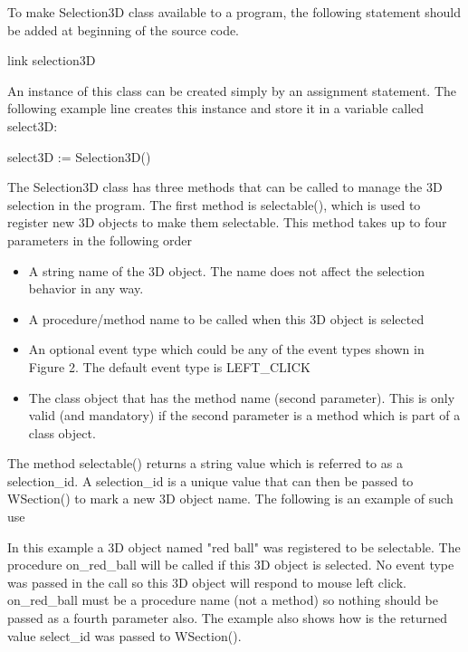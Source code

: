 \documentclass[letterpaper]{article}
\newcommand\liststyleLix{%
\renewcommand\theenumi{\arabic{enumi}}
\renewcommand\theenumii{\arabic{enumii}}
\renewcommand\theenumiii{\arabic{enumiii}}
\renewcommand\theenumiv{\arabic{enumiv}}
\renewcommand\labelenumi{\theenumi.}
\renewcommand\labelenumii{\theenumii.}
\renewcommand\labelenumiii{\theenumiii.}
\renewcommand\labelenumiv{\theenumiv.}
}
\begin{document}
{\bigskip

To make Selection3D class available to a program, the following
statement should be added at beginning of the source code.


\bigskip

{\sffamily
link selection3D}


\bigskip

An instance of this class can be created simply by an assignment
statement. The following example line creates this instance and store
it in a variable called \textsf{select3D:}

\bigskip

{\sffamily
select3D := Selection3D()}


\bigskip

The \textsf{Selection3D} class has three methods that can be called
to manage the 3D selection in the program. The first method is
\textsf{selectable()}, which is used to register new 3D objects to
make them selectable. This method takes up to four parameters in the
following order

\bigskip

\liststyleLix
\begin{itemize}
\item A string name of the 3D object. The name does not affect the selection behavior in any way.
\item A procedure/method name to be called when this 3D object is selected
\item An optional event type which could be any of the event types
shown in Figure 2. The default event type is \textsf{LEFT\_CLICK}
\item The class object that has the method name (second
	parameter). This is only valid (and mandatory) if the second 
	parameter is a method which is part of a class object.
\end{itemize}

\bigskip

The method \textsf{selectable()} returns a string value which is
referred to as a selection\_id. A selection\_id is a unique value
that can then be passed to \textsf{WSection()} to mark a new
3D object name. The following is an example of such use

\bigskip


\bigskip

In this example a 3D object named \textsf{"red ball"} was
registered to be selectable. The procedure \textsf{on\_red\_ball} will
be called if this 3D object is selected. No event type was passed in
the call so this 3D object will respond to mouse left
click. \textsf{on\_red\_ball} must be a procedure name (not a method)
so nothing should be passed as a fourth parameter also. The example
also shows how is the returned value \textsf{select\_id} was passed to
\textsf{WSection()}.

}
\end{document}
